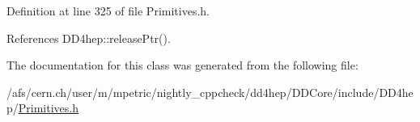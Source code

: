 Definition at line 325 of file Primitives.\+h.



References D\+D4hep\+::release\+Ptr().



The documentation for this class was generated from the following file\+:\begin{DoxyCompactItemize}
\item 
/afs/cern.\+ch/user/m/mpetric/nightly\+\_\+cppcheck/dd4hep/\+D\+D\+Core/include/\+D\+D4hep/\hyperlink{_primitives_8h}{Primitives.\+h}\end{DoxyCompactItemize}
